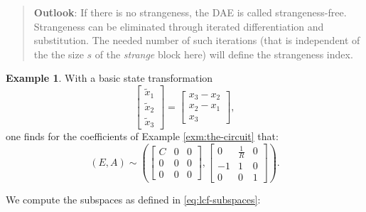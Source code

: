 \documentclass[]{book}
\newenvironment {JHSAYS} [0] {\begin{quote}\color{jhsc}} {\end{quote}}
\theoremstyle{definition}
\theoremstyle{definition}
\newtheorem{example}{Example}[chapter]
\theoremstyle{definition}
\theoremstyle{definition}
\theoremstyle{remark}
\begin{document}
\begin{JHSAYS}
\textbf{Outlook}: If there is no strangeness, the DAE is called
strangeness-free. Strangeness can be eliminated through iterated
differentiation and substitution. The needed number of such iterations
(that is independent of the the size \(s\) of the \emph{strange} block
here) will define the strangeness index.
\end{JHSAYS}

\begin{example}
\protect\hypertarget{exm:strangeness-in-the-circuit}{}{\label{exm:strangeness-in-the-circuit} }With a basic state transformation
\[
\begin{bmatrix}
\tilde x_1 \\ \tilde x_2 \\ \tilde x_3
\end{bmatrix}
= 
\begin{bmatrix}
x_3 - x_2 \\ x_2-x_1 \\ x_3
\end{bmatrix},
\]
one finds for the coefficients of Example \ref{exm:the-circuit} that:
\[
(E, A) \sim
\left(
\begin{bmatrix} C & 0 & 0 \\ 0 & 0 &0 \\ 0 & 0 &0  \end{bmatrix}
,
\begin{bmatrix} 0 & \frac{1}{R} & 0 \\ -1 & 1 & 0 \\ 0 & 0 & 1 \end{bmatrix}
\right).
\]

We compute the subspaces as defined in \eqref{eq:lcf-subspaces}:


\end{example}
\end{document}
